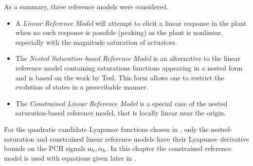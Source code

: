 As a summary, three reference models were considered.
\begin{itemize}
\item A \emph{Linear Reference Model} will attempt to elicit a linear response in the plant when no such response is possible (peaking) as the plant is nonlinear, especially with the magnitude saturation of actuators.
\item The \emph{Nested Saturation-based Reference Model} is an alternative to the linear reference model containing saturations functions appearing in a nested form and is based on the work by Teel\cite{teel:scl:1997,teel:itac:1996}. This form allows one to restrict the evolution of states in a prescribable manner.
\item The \emph{Constrained Linear Reference Model} is a special case of the nested saturation-based reference model, that is locally linear near the origin.
\end{itemize}

For the quadratic candidate Lyapunov functions chosen in \cite{kannan:phd}, only the nested-saturation and constrained linear reference models have their Lyapunov derivative bounds on the PCH signals $a_{h},\alpha_{h}$. In this chapter the constrained reference model is used with equations given later in .

\begin{comment}
\begin{equation}
\label{e:refmodelgains}
\begin{bmatrix}
\apd \\
\alpd
\end{bmatrix} =
\begin{bmatrix}
R_p & R_d & 0   &   0 \\
0   & 0   & K_p &   K_d
\end{bmatrix}\bfe,
\end{equation}
\end{comment}


%
